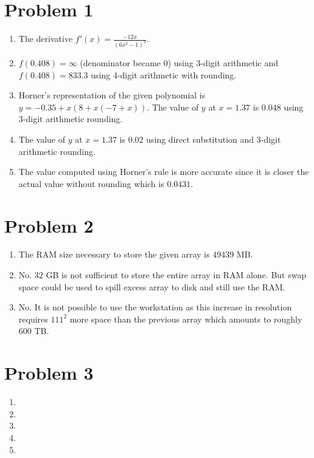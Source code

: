 \documentclass[12pt,letterpaper]{article}
\begin{document}
\section*{Problem 1}

\begin{enumerate}
  \item
   The derivative $f'(x) = \frac{-12x}{(6x^2-1)^2}$.
  \item
   $f(0.408) = \infty $ (denominator became $0$) using 3-digit arithmetic and $f(0.408) = 833.3$ using 4-digit arithmetic with rounding.
  \item
  Horner's representation of the given polynomial is $y = -0.35 + x(8 + x(-7 + x))$. The value of $y$ at $x=1.37$ is $0.048$ using 3-digit arithmetic rounding.
  \item 
  The value of $y$ at $x=1.37$ is $0.02$ using direct substitution and 3-digit arithmetic rounding.
  \item 
  The value computed using Horner's rule is more accurate since it is closer the actual value without rounding which is $0.0431$.  
\end{enumerate}


\section*{Problem 2}

\begin{enumerate}
	\item The RAM size necessary to store the given array is $49439$ MB.
	\item No. $32$ GB is not sufficient to store the entire array in RAM alone. But swap space could be used to spill excess array to disk and still use the RAM.
	\item No. It is not possible to use the workstation as this increase in resolution requires $111^2$ more space than the previous array which amounts to roughly $600$ TB.	
\end{enumerate}

\section*{Problem 3}

\begin{enumerate}
	\item 
	\item 
	\item 
	\item 
	\item
\end{enumerate}
\end{document}
